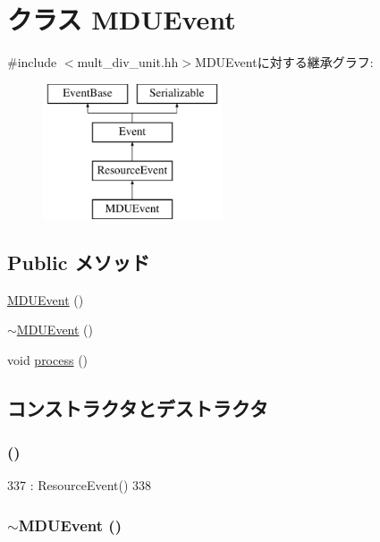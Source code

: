 \hypertarget{classMDUEvent}{
\section{クラス MDUEvent}
\label{classMDUEvent}
}


{\ttfamily \#include $<$mult\_\-div\_\-unit.hh$>$}MDUEventに対する継承グラフ:\begin{figure}[H]
\begin{center}
\leavevmode
\includegraphics[height=4cm]{classMDUEvent}
\end{center}
\end{figure}
\subsection*{Public メソッド}
\begin{DoxyCompactItemize}
\item 
\hyperlink{classMDUEvent_a6fa1a413f4f43e806cc74954660d312c}{MDUEvent} ()
\item 
\hyperlink{classMDUEvent_a3260c704d88f54a0ede3431959e35da7}{$\sim$MDUEvent} ()
\item 
void \hyperlink{classMDUEvent_a2e9c5136d19b1a95fc427e0852deab5c}{process} ()
\end{DoxyCompactItemize}


\subsection{コンストラクタとデストラクタ}
\hypertarget{classMDUEvent_a6fa1a413f4f43e806cc74954660d312c}{
\subsubsection[{MDUEvent}]{ ()}}
\label{classMDUEvent_a6fa1a413f4f43e806cc74954660d312c}



\begin{DoxyCode}
337     : ResourceEvent()
338 { }
\end{DoxyCode}
\hypertarget{classMDUEvent_a3260c704d88f54a0ede3431959e35da7}{
\subsubsection[{$\sim$MDUEvent}]{\setlength{\rightskip}{0pt plus 5cm}$\sim${\bf MDUEvent} ()}}
\label{classMDUEvent_a3260c704d88f54a0ede3431959e35da7}



